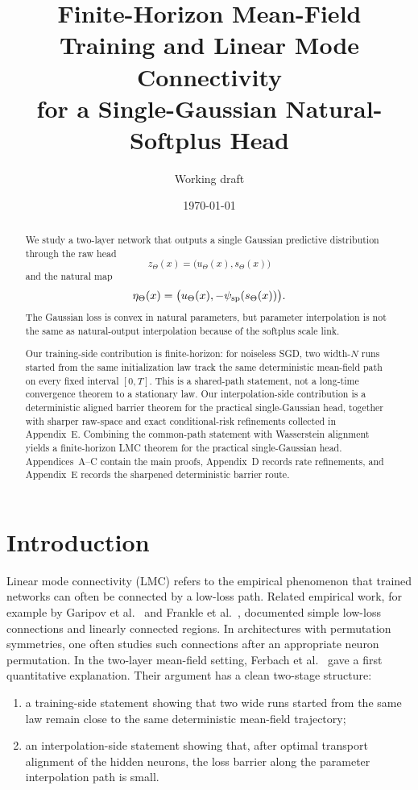 \documentclass[11pt]{article}
\title{Finite-Horizon Mean-Field Training and Linear Mode Connectivity\\for a Single-Gaussian Natural-Softplus Head}
\author{Working draft}
\date{\today}
\theoremstyle{definition}
\begin{document}
\maketitle

\begin{abstract}
We study a two-layer network that outputs a single Gaussian predictive
distribution through the raw head
\[
  z_\Theta(x)=\bigl(u_\Theta(x),s_\Theta(x)\bigr)
\]
and the natural map
\[
  \eta_\Theta(x)=\bigl(u_\Theta(x),-\psi_{\rm sp}(s_\Theta(x))\bigr).
\]
The Gaussian loss is convex in natural parameters, but parameter interpolation
is not the same as natural-output interpolation because of the softplus scale
link.

Our training-side contribution is finite-horizon: for noiseless SGD, two
width-$N$ runs started from the same initialization law track the same
deterministic mean-field path on every fixed interval $[0,T]$. This is a
shared-path statement, not a long-time convergence theorem to a stationary
law. Our interpolation-side contribution is a deterministic aligned barrier
theorem for the practical single-Gaussian head, together with sharper raw-space
and exact conditional-risk refinements collected in Appendix~E. Combining the
common-path statement with Wasserstein alignment yields a finite-horizon LMC
theorem for the practical single-Gaussian head. Appendices~A--C contain the
main proofs, Appendix~D records rate refinements, and Appendix~E records the
sharpened deterministic barrier route.
\end{abstract}

\section{Introduction}

Linear mode connectivity (LMC) refers to the empirical phenomenon that trained
networks can often be connected by a low-loss path. Related empirical work, for
example by Garipov et al.~\cite{Garipov2018} and
Frankle et al.~\cite{Frankle2020}, documented simple low-loss connections and
linearly connected regions. In architectures with permutation symmetries, one
often studies such connections after an appropriate neuron permutation. In the
two-layer mean-field setting, Ferbach et al.~\cite{Ferbach2024} gave a first
quantitative explanation. Their argument has a clean two-stage structure:
\begin{enumerate}[label=(\roman*)]
  \item a training-side statement showing that two wide runs started from the
  same law remain close to the same deterministic mean-field trajectory;
  \item an interpolation-side statement showing that, after optimal transport
  alignment of the hidden neurons, the loss barrier along the parameter
  interpolation path is small.
\end{enumerate}
\end{document}

